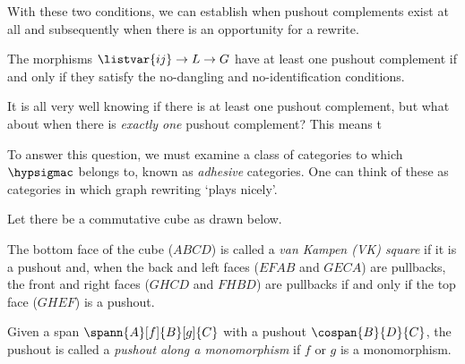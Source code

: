 With these two conditions, we can establish when pushout complements exist at
all and subsequently when there is an opportunity for a rewrite.

\begin{proposition}
    \label{prop:pushout-complement}
    The morphisms \(\listvar{ij} \to L \to G\) have at least one pushout
    complement if and only if they satisfy the no-dangling and no-identification
    conditions.
\end{proposition}

It is all very well knowing if there is at least one pushout complement, but
what about when there is \emph{exactly one} pushout complement?
This means t

To answer this question, we must examine a class of categories to which
\(\hypsigmac\) belongs to, known as \emph{adhesive} categories.
One can think of these as categories in which graph rewriting `plays nicely'.

\begin{definition}
    Let there be a commutative cube as drawn below.
    \begin{center}
    \end{center}
    The bottom face of the cube (\(ABCD\)) is called a
    \emph{van Kampen (VK) square} if it is a pushout and, when the back and
    left faces (\(EFAB\) and \(GECA\)) are pullbacks, the front and right faces
    (\(GHCD\) and \(FHBD\)) are pullbacks if and only if the top face (\(GHEF\))
    is a pushout.
\end{definition}

\begin{definition}
    Given a span \(\spann{A}[f]{B}[g]{C}\) with a pushout \(\cospan{B}{D}{C}\),
    the pushout is called a \emph{pushout along a monomorphism} if \(f\) or
    \(g\) is a monomorphism.
\end{definition}


